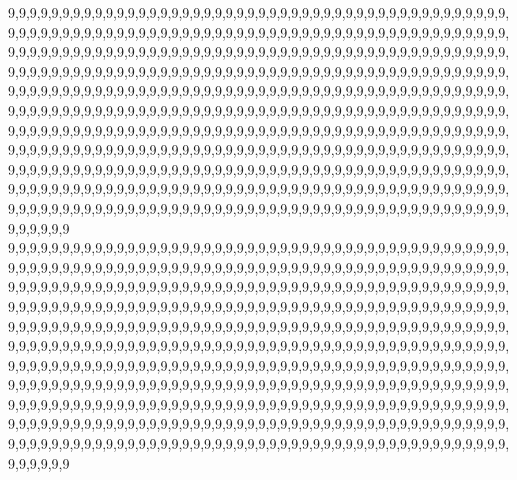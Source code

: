 9,9,9,9,9,9,9,9,9,9,9,9,9,9,9,9,9,9,9,9,9,9,9,9,9,9,9,9,9,9,9,9,9,9,9,9,9,9,9,9,9,9,9,9,9,9,9,9,9,9,9,9,9,9,9,9,9,9,9,9,9,9,9,9,9,9,9,9,9,9,9,9,9,9,9,9,9,9,9,9,9,9,9,9,9,9,9,9,9,9,9,9,9,9,9,9,9,9,9,9,9,9,9,9,9,9,9,9,9,9,9,9,9,9,9,9,9,9,9,9,9,9,9,9,9,9,9,9,9,9,9,9,9,9,9,9,9,9,9,9,9,9,9,9,9,9,9,9,9,9,9,9,9,9,9,9,9,9,9,9,9,9,9,9,9,9,9,9,9,9,9,9,9,9,9,9,9,9,9,9,9,9,9,9,9,9,9,9,9,9,9,9,9,9,9,9,9,9,9,9,9,9,9,9,9,9,9,9,9,9,9,9,9,9,9,9,9,9,9,9,9,9,9,9,9,9,9,9,9,9,9,9,9,9,9,9,9,9,9,9,9,9,9,9,9,9,9,9,9,9,9,9,9,9,9,9,9,9,9,9,9,9,9,9,9,9,9,9,9,9,9,9,9,9,9,9,9,9,9,9,9,9,9,9,9,9,9,9,9,9,9,9,9,9,9,9,9,9,9,9,9,9,9,9,9,9,9,9,9,9,9,9,9,9,9,9,9,9,9,9,9,9,9,9,9,9,9,9,9,9,9,9,9,9,9,9,9,9,9,9,9,9,9,9,9,9,9,9,9,9,9,9,9,9,9,9,9,9,9,9,9,9,9,9,9,9,9,9,9,9,9,9,9,9,9,9,9,9,9,9,9,9,9,9,9,9,9,9,9,9,9,9,9,9,9,9,9,9,9,9,9,9,9,9,9,9,9,9,9,9,9,9,9,9,9,9,9,9,9,9,9,9,9,9,9,9,9,9,9,9,9,9,9,9,9,9,9,9,9,9,9,9,9,9,9,9,9,9,9,9,9,9,9,9,9,9,9,9,9,9,9,9,9,9,9,9,9,9,9,9,9,9,9,9,9,9,9,9,9,9,9,9,9,9,9,9,9,9,9,9,9,9,9,9,9,9,9,9,9,9,9,9,9,9,9,9,9,9,9,9,9,9
9,9,9,9,9,9,9,9,9,9,9,9,9,9,9,9,9,9,9,9,9,9,9,9,9,9,9,9,9,9,9,9,9,9,9,9,9,9,9,9,9,9,9,9,9,9,9,9,9,9,9,9,9,9,9,9,9,9,9,9,9,9,9,9,9,9,9,9,9,9,9,9,9,9,9,9,9,9,9,9,9,9,9,9,9,9,9,9,9,9,9,9,9,9,9,9,9,9,9,9,9,9,9,9,9,9,9,9,9,9,9,9,9,9,9,9,9,9,9,9,9,9,9,9,9,9,9,9,9,9,9,9,9,9,9,9,9,9,9,9,9,9,9,9,9,9,9,9,9,9,9,9,9,9,9,9,9,9,9,9,9,9,9,9,9,9,9,9,9,9,9,9,9,9,9,9,9,9,9,9,9,9,9,9,9,9,9,9,9,9,9,9,9,9,9,9,9,9,9,9,9,9,9,9,9,9,9,9,9,9,9,9,9,9,9,9,9,9,9,9,9,9,9,9,9,9,9,9,9,9,9,9,9,9,9,9,9,9,9,9,9,9,9,9,9,9,9,9,9,9,9,9,9,9,9,9,9,9,9,9,9,9,9,9,9,9,9,9,9,9,9,9,9,9,9,9,9,9,9,9,9,9,9,9,9,9,9,9,9,9,9,9,9,9,9,9,9,9,9,9,9,9,9,9,9,9,9,9,9,9,9,9,9,9,9,9,9,9,9,9,9,9,9,9,9,9,9,9,9,9,9,9,9,9,9,9,9,9,9,9,9,9,9,9,9,9,9,9,9,9,9,9,9,9,9,9,9,9,9,9,9,9,9,9,9,9,9,9,9,9,9,9,9,9,9,9,9,9,9,9,9,9,9,9,9,9,9,9,9,9,9,9,9,9,9,9,9,9,9,9,9,9,9,9,9,9,9,9,9,9,9,9,9,9,9,9,9,9,9,9,9,9,9,9,9,9,9,9,9,9,9,9,9,9,9,9,9,9,9,9,9,9,9,9,9,9,9,9,9,9,9,9,9,9,9,9,9,9,9,9,9,9,9,9,9,9,9,9,9,9,9,9,9,9,9,9,9,9,9,9,9,9,9,9,9,9,9,9,9,9,9,9,9,9,9,9,9,9,9,9,9,9,9,9,9,9,9,9,9,9,9,9
